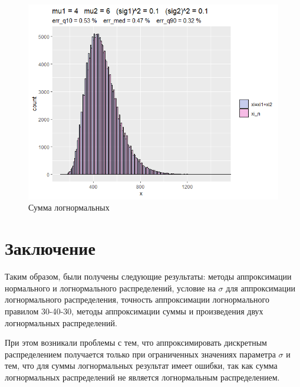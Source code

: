 \documentclass[12pt]{article}
\begin{document}
\begin{figure}[h]
	\begin{center}
			\includegraphics[width=1\linewidth]{hist1.png}
			\caption{Сумма логнормальных}
			\label{ris2}
	\end{center}
\end{figure}

	\section{Заключение}
	
Таким образом, были получены следующие результаты: методы аппроксимации нормального и логнормального распределений, условие на $\sigma$ для аппроксимации логнормального распределения, точность аппроксимации логнормального правилом 30-40-30, методы аппроксимации суммы и произведения двух логнормальных распределений.

При этом возникали проблемы с тем, что аппроксимировать дискретным распределением получается только при ограниченных значениях параметра $\sigma$ и тем, что для суммы логнормальных результат имеет ошибки, так как сумма логнормальных распределений не является логнормальным распределением.
	
\end{document}
